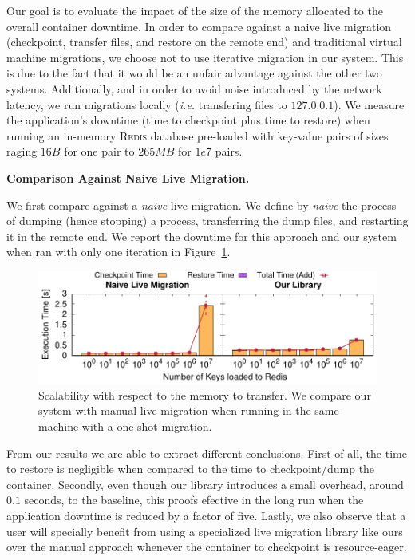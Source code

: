 Our goal is to evaluate the impact of the size of the memory allocated to the overall container downtime.
In order to compare against a naive live migration (checkpoint, transfer files, and restore on the remote end) and traditional virtual machine migrations, we choose not to use iterative migration in our system.
This is due to the fact that it would be an unfair advantage against the other two systems.
Additionally, and in order to avoid noise introduced by the network latency, we run migrations locally (\textit{i.e.} transfering files to $127.0.0.1$).
We measure the application's downtime (time to checkpoint plus time to restore) when running an in-memory \textsc{Redis} database pre-loaded with key-value pairs of sizes raging $16 B$ for one pair to $265 MB$ for $1e7$ pairs.

\textbf{Comparison Against Naive Live Migration.}

We first compare against a \textit{naive} live migration.
We define by \textit{naive} the process of dumping (hence stopping) a process, transferring the dump files, and restarting it in the remote end.
We report the downtime for this approach and our system when ran with only one iteration in Figure~\ref{fig:key-scalability}.
\begin{figure}[h!]
    \centering
    \includegraphics[width=\textwidth]{figs/key-scalability/key_scalability.pdf}
    \caption[Scalability with respect to the memory to transfer.]{Scalability with respect to the memory to transfer. We compare our system with manual live migration when running in the same machine with a one-shot migration.\label{fig:key-scalability}}
\end{figure}

From our results we are able to extract different conclusions.
First of all, the time to restore is negligible when compared to the time to checkpoint/dump the container.
Secondly, even though our library introduces a small overhead, around $0.1$ seconds, to the baseline, this proofs efective in the long run when the application downtime is reduced by a factor of five.
Lastly, we also observe that a user will specially benefit from using a specialized live migration library like ours over the manual approach whenever the container to checkpoint is resource-eager.

